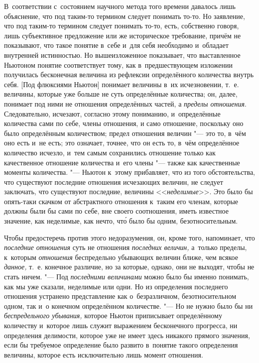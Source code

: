 В~соответствии с~состоянием научного метода того времени давалось лишь
объяснение, что под таким-то термином следует понимать то-то. Но заявление,
что под таким-то термином следует понимать то-то, есть, собственно говоря,
лишь субъективное предложение или же историческое требование, причём не
показывают, что такое понятие в~себе и~для себя необходимо и~обладает внутренней
истинностью. Но вышеизложенное показывает, что выставленное Ньютоном понятие
соответствует тому, как в~предшествующем изложении получилась бесконечная
величина из рефлексии определённого количества внутрь себя. [Под флюксиями
Ньютон] понимает величины в~их исчезновении, т.~е. величины, которые уже больше
не суть определённые количества; он, далее, понимает под ними не отношения
определённых частей, а {\em пределы отношения}. Следовательно, исчезают, согласно
этому пониманию, и~определённые количества сами по себе, члены отношения, и
само отношение, поскольку оно было определённым количеством; предел
отношения величин "--- это то, в~чём оно есть и~не есть; это означает, точнее, что
он есть то, в~чём определённое количество исчезло, и~тем самым сохранились
отношение только как качественное отношение количества и~его члены "--- также
как качественные моменты количества. "--- Ньютон к~этому прибавляет, что из
того обстоятельства, что существуют последние отношения исчезающих величин, не
следует заключать, что существуют последние, величины <<{\em неделимые}>>. Это
было бы опять-таки скачком от абстрактного отношения к~таким его членам,
которые должны были бы сами по себе, вне своего соотношения, иметь известное
значение, как неделимые, как нечто, чт\'{о} было бы одним, безотносительным.

Чтобы предостеречь против этого недоразумения, он, кроме того, напоминает, что
{\em последние отношения} суть не отношения {\em последних величин,} а~только
пределы, к~которым {\em отношения} беспредельно убывающих величин
ближе, чем всякое {\em данное,} т.~е. конечное различие, но за которые, однако, они не
выходят, чтобы не стать ничем. "--- Под {\em последними величинами} можно было
бы именно понимать, как мы уже сказали, неделимые или одни. Но из определения
последнего отношения устранено представление как о~безразличном,
безотносительном одном, так и~о конечном определённом количестве. "--- Но
не нужно было бы ни {\em беспредельного убывания,} которое Ньютон приписывает
определённому количеству и~которое лишь служит выражением бесконечного
прогресса, ни определения делимости, которое уже не имеет здесь никакого
прямого значения, если бы требуемое определение было развито
в~понятие такого определения величины, которое есть исключительно
лишь момент отношения.

